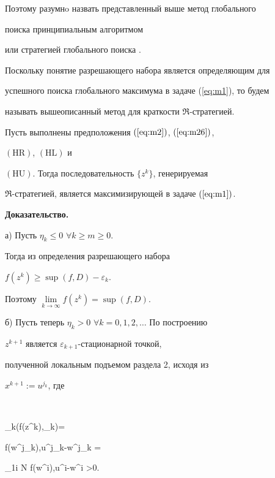 Поэтому разумнo назвать представленный выше метод глобального


поиска принципиальным алгоритмом \cite{l23}


или стратегией глобального поиска \cite{l9}. 


Поскольку понятие разрешающего набора является определяющим для


успешного поиска глобального максимума в задаче (\ref{eq:m1}), то будем


называть вышеописанный метод для краткости $\Re$-стратегией.





\begin{thm}\label{Theorem2}


Пусть выполнены предположения $(\ref{eq:m2})$, $(\ref{eq:m26})$,


$\mathrm{(HR)}$, $\mathrm{(HL)}$ и 


$\mathrm{(HU)}$. Тогда последовательность $\{ z^{k} \}$, генерируемая


$\Re$-стратегией, является максимизирующей в задаче $(\ref{eq:m1})$.


\end{thm}





{\bf Доказательство.}


а) Пусть $\eta_{k} \leq 0$ $\forall k \geq m \geq 0$. 


Тогда из определения разрешающего набора


$f(z^{k}) \geq \sup(f,D)-\varepsilon_{k}$.


Поэтому $\lim\limits_{k \rightarrow \infty}f(z^{k})=\sup(f,D)$.





б) Пусть теперь $\eta_{k}>0$ $\forall k=0,1,2,\dotsc$ По построению


$z^{k+1}$ является $\varepsilon_{k+1}$-стационарной точкой,


полученной локальным подъемом раздела 2, исходя из


$x^{k+1}:=u^{j_{k}} $, где


$$


\eta_{k}\triangleq \eta(f(z^{k}),\varepsilon_{k})=


\langle \nabla f(w^{j_{k}}),u^{j_{k}}-w^{j_{k}} \rangle = 


\max_{1\leq i \leq N} \langle \nabla f(w^{i}),u^{i}-w^{i} \rangle >0.


